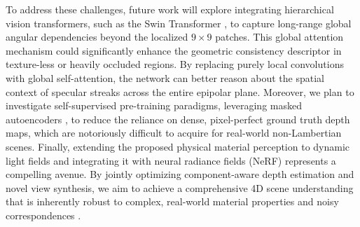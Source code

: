 \documentclass[lettersize,journal]{IEEEtran}
\begin{document}
To address these challenges, future work will explore integrating hierarchical vision transformers, such as the Swin Transformer \cite{liu2021}, to capture long-range global angular dependencies beyond the localized $9 \times 9$ patches. This global attention mechanism \cite{vaswani2017} could significantly enhance the geometric consistency descriptor in texture-less or heavily occluded regions. By replacing purely local convolutions with global self-attention, the network can better reason about the spatial context of specular streaks across the entire epipolar plane. Moreover, we plan to investigate self-supervised pre-training paradigms, leveraging masked autoencoders \cite{he2022}, to reduce the reliance on dense, pixel-perfect ground truth depth maps, which are notoriously difficult to acquire for real-world non-Lambertian scenes. Finally, extending the proposed physical material perception to dynamic light fields and integrating it with neural radiance fields (NeRF) \cite{ng2022} represents a compelling avenue. By jointly optimizing component-aware depth estimation and novel view synthesis, we aim to achieve a comprehensive 4D scene understanding that is inherently robust to complex, real-world material properties and noisy correspondences \cite{wang2023}.



\end{document}
